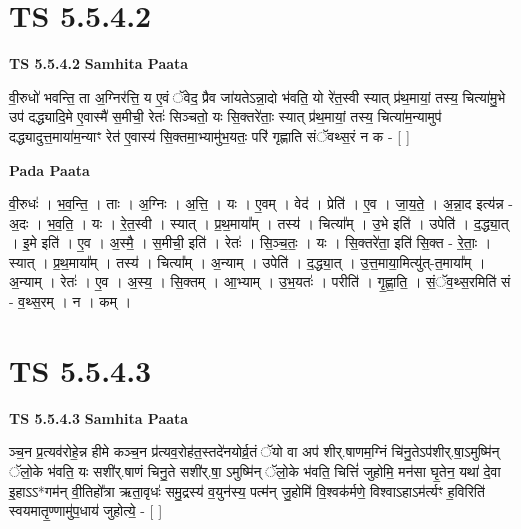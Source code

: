 \documentclass[17pt]{extarticle}
\begin{document}

\section{ TS 5.5.4.2 }

\textbf{TS 5.5.4.2 } \newline
\textbf{Samhita Paata} \newline

वी॒रुधो॑ भवन्ति॒ ता अ॒ग्निर॑त्ति॒ य ए॒वं ॅवेद॒ प्रैव जा॑यतेऽन्ना॒दो भ॑वति॒ यो रे॑त॒स्वी स्यात् प्र॑थ॒मायां॒ तस्य॒ चित्या॑मु॒भे उप॑ दद्ध्यादि॒मे ए॒वास्मै॑ स॒मीची॒ रेतः॑ सिञ्चतो॒ यः सि॒क्तरे॑ताः॒ स्यात् प्र॑थ॒मायां॒ तस्य॒ चित्या॑म॒न्यामुप॑ दद्ध्यादुत्त॒माया॑म॒न्याꣳ रेत॑ ए॒वास्य॑ सि॒क्तमा॒भ्यामु॑भ॒यतः॒ परि॑ गृह्णाति संॅवथ्स॒रं न क - [  ] \newline

\textbf{Pada Paata} \newline

वी॒रुधः॑ । भ॒व॒न्ति॒ । ताः । अ॒ग्निः । अ॒त्ति॒ । यः । ए॒वम् । वेद॑ । प्रेति॑ । ए॒व । जा॒य॒ते॒ । अ॒न्ना॒द इत्य॑न्न - अ॒दः । भ॒व॒ति॒ । यः । रे॒त॒स्वी । स्यात् । प्र॒थ॒माया᳚म् । तस्य॑ । चित्या᳚म् । उ॒भे इति॑ । उपेति॑ । द॒द्ध्या॒त् । इ॒मे इति॑ । ए॒व । अ॒स्मै॒ । स॒मीची॒ इति॑ । रेतः॑ । सि॒ञ्च॒तः॒ । यः । सि॒क्तरे॑ता॒ इति॑ सि॒क्त - रे॒ताः॒ । स्यात् । प्र॒थ॒माया᳚म् । तस्य॑ । चित्या᳚म् । अ॒न्याम् । उपेति॑ । द॒द्ध्या॒त् । उ॒त्त॒माया॒मित्यु॑त्-त॒माया᳚म् । अ॒न्याम् । रेतः॑ । ए॒व । अ॒स्य॒ । सि॒क्तम् । आ॒भ्याम् । उ॒भ॒यतः॑ । परीति॑ । गृ॒ह्णा॒ति॒ । सं॒ॅव॒थ्स॒रमिति॑ सं - व॒थ्स॒रम् । न । कम् ।  \newline





\section{ TS 5.5.4.3 }

\textbf{TS 5.5.4.3 } \newline
\textbf{Samhita Paata} \newline

ञ्च॒न प्र॒त्यव॑रोहे॒न्न हीमे कञ्च॒न प्र॑त्यव॒रोह॑त॒स्तदे॑नयोर्व्र॒तं ॅयो वा अप॑ शीर्.षाणम॒ग्निं चि॑नु॒तेऽप॑शीर्.षा॒ऽमुष्मि॑न् ॅलो॒के भ॑वति॒ यः सशी॑र्.षाणं चिनु॒ते सशी॑र्.षा॒ ऽमुष्मि॑न् ॅलो॒के भ॑वति॒ चित्तिं॑ जुहोमि॒ मन॑सा घृ॒तेन॒ यथा॑ दे॒वा इ॒हाऽऽ*गम॑न् वी॒तिहो᳚त्रा ऋता॒वृधः॑ समु॒द्रस्य॑ व॒युन॑स्य॒ पत्म॑न् जु॒होमि॑ वि॒श्वक॑र्मणे॒ विश्वाऽहाऽम॑र्त्यꣳ ह॒विरिति॑ स्वयमातृ॒ण्णामु॑प॒धाय॑ जुहोत्ये॒ - [  ] \newline
\end{document}
